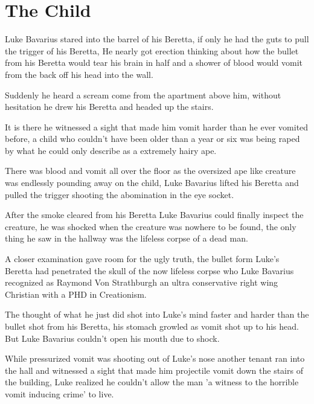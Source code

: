 \chapter{The Child}


Luke Bavarius stared into the barrel of his Beretta, if only he had
the guts to pull the trigger of his Beretta, He nearly got erection
thinking about how the bullet from his Beretta would tear his brain
in half and a shower of blood would vomit from the back off his
head into the wall.



Suddenly he heard a scream come from the apartment above him,
without hesitation he drew his Beretta and headed up the
stairs.



It is there he witnessed a sight that made him vomit harder than he
ever vomited before, a child who couldn't have been older
than a year or six was being raped by what he could only describe
as a extremely hairy ape.



There was blood and vomit all over the floor as the oversized ape
like creature was endlessly pounding away on the child, Luke
Bavarius lifted his Beretta and pulled the trigger shooting the
abomination in the eye socket.



After the smoke cleared from his Beretta Luke Bavarius could
finally inspect the creature, he was shocked when the creature was
nowhere to be found, the only thing he saw in the hallway was the
lifeless corpse of a dead man.



A closer examination gave room for the ugly truth, the bullet form
Luke's Beretta had penetrated the skull of the now lifeless
corpse who Luke Bavarius recognized as Raymond Von Strathburgh an
ultra conservative right wing Christian with a PHD in
Creationism.



The thought of what he just did shot into Luke's mind faster
and harder than the bullet shot from his Beretta, his stomach
growled as vomit shot up to his head. But Luke Bavarius
couldn't open his mouth due to shock.



While pressurized vomit was shooting out of Luke's nose
another tenant ran into the hall and witnessed a sight that made
him projectile vomit down the stairs of the building, Luke realized
he couldn't allow the man 'a witness to the horrible vomit
inducing crime' to live.



